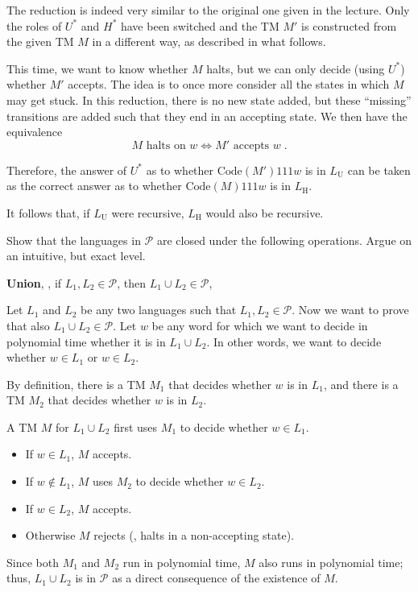 \documentclass{exercise}
\begin{document}
\begin{solution}
  The reduction is indeed very similar to the original one given in the
  lecture.  Only the roles of $U^*$ and $H^*$ have been switched and the TM $M'$ is
  constructed from the given TM $M$ in a different way, as described in what follows.

  This time, we want to know whether $M$ halts, but we can only decide (using $U^*$)
  whether $M'$ accepts.
  The idea is to once more consider all the states in which $M$ may get stuck.
  In this reduction, there is no new state added, but these ``missing'' transitions are
  added such that they end in an accepting state.  We then have the
  equivalence
  \[ M \text{ halts on } w \iff M' \text{ accepts } w\;. \]

  Therefore, the answer of $U^*$ as to whether $\text{Code}(M')111w$ is in $L_{\text{U}}$ can be
  taken as the correct answer as to whether $\text{Code}(M)111w$ is in $L_{\text{H}}$.

  It follows that, if $L_{\text{U}}$ were recursive, $L_{\text{H}}$ would also
  be recursive.
\end{solution}



Show that the languages in $\mathcal{P}$ are closed under the following
operations.  Argue on an intuitive, but exact level.

\subtask \textbf{Union}, \ie, if $L_1,L_2\in\mathcal{P}$, then $L_1\cup L_2\in\mathcal{P}$,

  \begin{solution}
    Let $L_1$ and $L_2$ be any two languages such that $L_1,L_2\in\mathcal{P}$.
    Now we want to prove that also $L_1\cup L_2\in\mathcal{P}$.  Let $w$ be any
    word for which we want to decide in polynomial time whether it is in
    $L_1\cup L_2$. In other words, we want to decide whether $w\in L_1$ or
    $w\in L_2$.

    By definition, there is a TM $M_1$ that decides whether $w$ is in $L_1$,
    and there is a TM $M_2$ that decides whether $w$ is in $L_2$. 

    A TM $M$ for $L_1\cup L_2$ first uses $M_1$ to decide whether $w\in L_1$.

    \begin{itemize}
      \item If $w\in L_1$, $M$ accepts.
      \item If $w\notin L_1$, $M$ uses $M_2$ to decide whether $w\in L_2$.
      \item If $w\in L_2$, $M$ accepts.
      \item Otherwise $M$ rejects (\ie, halts in a non-accepting state).
    \end{itemize}

    Since both $M_1$ and $M_2$ run in polynomial time, $M$ also runs in
    polynomial time; thus, $L_1\cup L_2$ is in $\mathcal{P}$ as a direct
    consequence of the existence of $M$.
  \end{solution}
\end{document}
